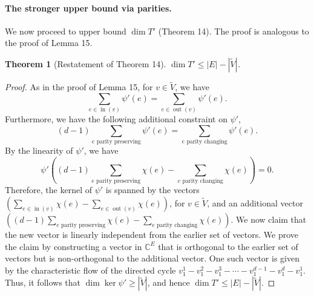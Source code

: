 \documentclass[10pt,a4paper]{article}
\newtheorem{theorem}{Theorem}
\newcommand{\C}{\mathbb C}
\DeclareMathOperator{\inset}{in}
\DeclareMathOperator{\outset}{out}
\begin{document}
\paragraph{The stronger upper bound via parities.}
We now proceed to upper bound $\dim T'$ (Theorem 14). The proof is analogous to the proof of Lemma 15.
\begin{theorem}[Restatement of Theorem 14]$\dim T'\le|E|-|\widetilde V|$.\end{theorem}
\begin{proof}
As in the proof of Lemma 15, for $v\in\widetilde V$, we have
\[\sum_{e\in\inset(v)}\psi'(e)=\sum_{e\in\outset(v)}\psi'(e).\]
Furthermore, we have the following additional constraint on $\psi'$,
\[(d-1)\sum_{e\text{ parity preserving}}\psi'(e)=\sum_{e\text{ parity changing}}\psi'(e).\]
By the linearity of $\psi'$, we have
\[\psi'\left((d-1)\sum_{e\text{ parity preserving}}\chi(e)-\sum_{e\text{ parity changing}}\chi(e)\right)=0.\]
Therefore, the kernel of $\psi'$ is spanned by the vectors $(\sum_{e\in\inset(v)}\chi(e)-\sum_{e\in\outset(v)}\chi(e))$, for $v\in\widetilde V$, and an additional vector $((d-1)\sum_{e\text{ parity preserving}}\chi(e)-\sum_{e\text{ parity changing}}\chi(e))$.
We now claim that the new vector is linearly independent from the earlier set of vectors. We prove the claim by constructing a vector in $\C^E$ that is orthogonal to the earlier set of vectors but is non-orthogonal to the additional vector. One such vector is given by the characteristic flow of the directed cycle $v^1_1-v^2_1-v^3_1-\cdots-v^{d-1}_1-v^d_1-v^1_1$.
Thus, it follows that $\dim\ker\psi'\ge|\widetilde V|$, and hence $\dim T'\le|E|-|\widetilde V|$.
\end{proof}
\end{document}
